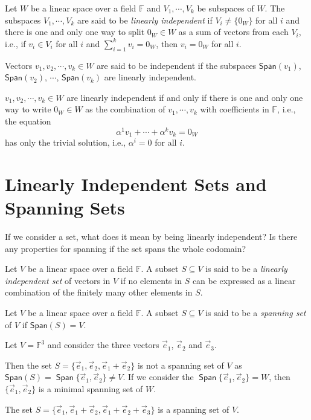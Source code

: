 \documentclass[
	11pt, %
	fleqn, %
	a4paper, %
]{LegrandOrangeBook}
\renewcommand{\span}[1]{\mathsf{Span}(#1)} %
\newcommand{\F}{\mathbb{F}} %
\DeclareMathOperator{\Span}{\mathsf{Span}}
\begin{document}
\begin{definition} \label{def:linear_independence}
    Let $W$ be a linear space over a field $\F$ and $V_1, \cdots, V_k$ be subspaces of $W$. The subspaces $V_1, \cdots, V_k$ are said to be \emph{linearly independent} if $V_i \neq \{0_W\}$ for all $i$ and there is one and only one way to split $0_W \in W$ as a sum of vectors from each $V_i$, i.e., if $v_i \in V_i$ for all $i$ and $\sum_{i=1}^{k} v_i = 0_W$, then $v_i = 0_W$ for all $i$.
\end{definition}

Vectors $v_1, v_2, \cdots, v_k \in W$ are said to be independent if the subspaces $\span{v_1}$, $\span{v_2}$, $\cdots$, $\span{v_k}$ are linearly independent.

\begin{proposition}
    $v_1, v_2, \cdots, v_k \in W$ are linearly independent if and only if there is one and only one way to write $0_W \in W$ as the combination of $v_1, \cdots, v_k$ with coefficients in $\F$, i.e., the equation 
    \[
        \alpha^1 v_1 + \cdots + \alpha^k v_k = 0_W
    \]
    has only  the trivial solution, i.e., $\alpha^i = 0$ for all $i$.
\end{proposition}

\newpage

\section{Linearly Independent Sets and Spanning Sets}

If we consider a set, what does it mean by being linearly independent? Is there any properties for spanning if the set spans the whole codomain?

\begin{definition}
    Let $V$ be a linear space over a field $\F$. A subset $S \subseteq V$ is said to be a \emph{linearly independent set} of vectors in $V$ if no elements in $S$ can be expressed as a linear combination of the finitely many other elements in $S$.
\end{definition}

\begin{definition}
    Let $V$ be a linear space over a field $\F$. A subset $S \subseteq V$ is said to be a \emph{spanning set} of $V$ if $\span{S} = V$.
\end{definition}

\begin{example}
    Let $V = \F^3$ and consider the three vectors $\vec{e}_1$, $\vec{e}_2$ and $\vec{e}_3$. 
    
    Then the set $S = \{\vec{e}_1, \vec{e}_2, \vec{e}_1 + \vec{e}_2\}$ is not a spanning set of $V$ as $\span{S} = \Span \{\vec{e}_1, \vec{e}_2\} \neq V$. If we consider the $\Span \{\vec{e}_1, \vec{e}_2\} = W$, then $\{\vec{e}_1, \vec{e}_2\}$ is a minimal spanning set of $W$.

    The set $S = \{\vec{e}_1, \vec{e}_1 + \vec{e}_2, \vec{e}_1 + \vec{e}_2 + \vec{e}_3\}$ is a spanning set of $V$.
\end{example}
\end{document}
